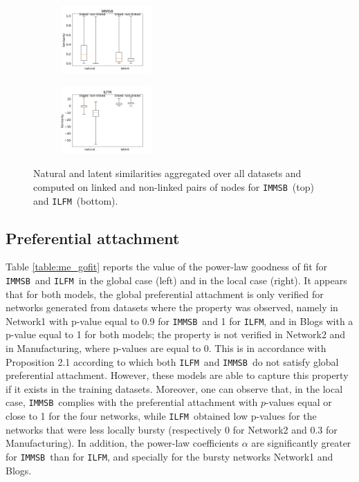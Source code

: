 \documentclass[journal]{IEEEtran}
\newcommand{\ifm}{\texttt{ILFM}}
\newcommand{\imb}{\texttt{IMMSB}}
\begin{document}
\begin{figure}[ht]
\centering
    \begin{subfigure}
       	 \centering
        	 \includegraphics[width=0.38\textwidth]{img/corpus/homo_mustach_immsb}
    \end{subfigure}
    \begin{subfigure}
        	 \centering
          \includegraphics[width=0.38\textwidth]{img/corpus/homo_mustach_ilfm}
    \end{subfigure}
    \caption{Natural and latent similarities aggregated over all datasets and computed on linked and non-linked pairs of nodes for \imb\ (top) and \ifm\ (bottom).}
    \label{fig:homo_mustach}
\end{figure}

\subsection{Preferential attachment}

Table \ref{table:me_gofit} reports the value of the power-law goodness of fit for \imb\ and \ifm\ in the global case (left) and in the local case (right). It appears that for both models, the global preferential attachment is only verified for networks generated from datasets where the property was observed, namely in Network1 with p-value equal to 0.9 for \imb\ and 1 for \ifm, and in Blogs with a p-value equal to 1 for both models; the property is not verified in Network2 and in Manufacturing, where p-values are equal to 0. This is in accordance with Proposition 2.1 according to which both \ifm\ and \imb\ do not satisfy global preferential attachment. However, these models are able to capture this property if it exists in the training datasets.  Moreover, one can observe that, in the local case, \imb\ complies with the preferential attachment with $p$-values equal or close to 1 for the four networks, while \ifm\ obtained low p-values for the networks that were less locally bursty (respectively  0  for Network2 and 0.3 for Manufacturing). In addition, the power-law coefficients $\alpha$ are significantly greater for \imb\ than for \ifm, and specially for the bursty networks Network1 and Blogs.
\end{document}
